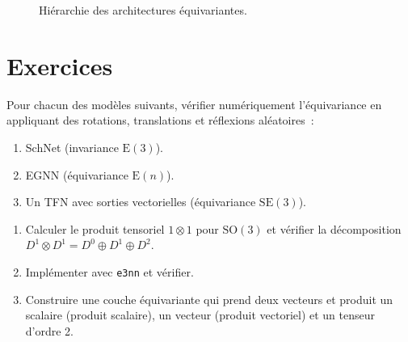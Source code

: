 \begin{figure}[htbp]
\centering
{}
\caption{Hi\'erarchie des architectures \'equivariantes.}
\end{figure}

\section*{Exercices}

\begin{exercice}
Pour chacun des mod\`eles suivants, v\'erifier num\'eriquement l'\'equivariance
en appliquant des rotations, translations et r\'eflexions al\'eatoires~:
\begin{enumerate}
    \item SchNet (invariance $\mathrm{E}(3)$).
    \item EGNN (\'equivariance $\mathrm{E}(n)$).
    \item Un TFN avec sorties vectorielles (\'equivariance $\mathrm{SE}(3)$).
\end{enumerate}
\end{exercice}

\begin{exercice}
\begin{enumerate}
    \item Calculer le produit tensoriel $1 \otimes 1$ pour $\mathrm{SO}(3)$
          et v\'erifier la d\'ecomposition $D^1 \otimes D^1 = D^0 \oplus D^1 \oplus D^2$.
    \item Impl\'ementer avec \texttt{e3nn} et v\'erifier.
    \item Construire une couche \'equivariante qui prend deux vecteurs et produit
          un scalaire (produit scalaire), un vecteur (produit vectoriel) et un
          tenseur d'ordre 2.
\end{enumerate}
\end{exercice}

